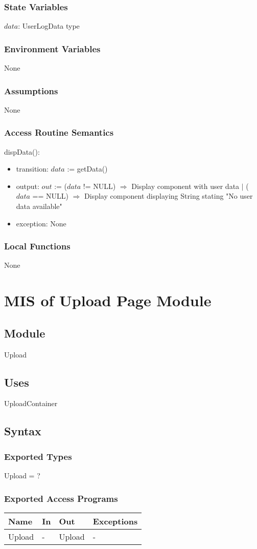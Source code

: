\documentclass[12pt, titlepage]{article}
\begin{document}
\subsubsection{State Variables}
$data$: UserLogData type
\subsubsection{Environment Variables}
None
\subsubsection{Assumptions}
None
\subsubsection{Access Routine Semantics}
\noindent dispData():
\begin{itemize}
	\item transition: $data$ := getData()
	\item output: $out$ := ($data$ != NULL) $\Rightarrow$ Display component with user data $|$ ($data$ == NULL) $\Rightarrow$ Display component displaying String stating "No user data available"
	\item exception: None
\end{itemize}
\subsubsection{Local Functions}
None

\newpage

\section{MIS of Upload Page Module}
\subsection{Module}
Upload
\subsection{Uses}
UploadContainer
\subsection{Syntax}
\subsubsection{Exported Types}
Upload = ?
\subsubsection{Exported Access Programs}
\begin{center}
	\begin{tabular}{p{2cm} p{4cm} p{4cm} p{2cm}}
		\hline
		\textbf{Name} & \textbf{In} & \textbf{Out} & \textbf{Exceptions} \\
		\hline
		Upload & - & Upload & - \\
		\hline
	\end{tabular}
\end{center}
\end{document}
